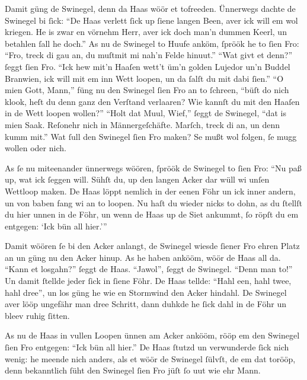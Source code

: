 Damit güng de Swinegel, denn da Haas wöör et tofreeden. Ünnerwegs
dachte de Swinegel bi ſick:
\enquote{De Haas verlett ſick up ſiene langen Been, aver ick will em
wol kriegen. He is zwar en vörnehm Herr, aver ick doch man'n dummen
Keerl, un betahlen ſall he doch.}
As nu de Swinegel to Huufe anköm, ſpröök he to ſien Fro:
\enquote{Fro, treck di gau an, du muſtmit mi nah'n
Felde hinuut.}
\enquote{Wat givt et denn?} ſeggt ſien Fro.
\enquote{Ick hew mit'n Haaſen wett't üm'n golden Lujedor un'n Buddel
Branwien, ick will mit em inn Wett loopen, un da ſalſt du mit dabi
ſien.}
\enquote{O mien Gott, Mann,} füng nu den Swinegel ſien Fro an to
ſchreen, \enquote{büſt do nich klook, heſt du denn ganz den Verſtand
verlaaren? Wie kannſt du mit den Haaſen in de Wett loopen wollen?}
\enquote{Holt dat Muul, Wief,} ſeggt de Swinegel, \enquote{dat is
mien Saak. Reſonehr nich in Männergeſchäfte. Marſch, treck di an, un
denn kumm mit.}
Wat ſull den Swinegel ſien Fro maken? Se mußt wol folgen, ſe mugg
wollen oder nich.

As ſe nu miteenander ünnerwegs wöören, ſpröök de Swinegel to ſien
Fro:
\enquote{Nu paß up, wat ick ſeggen will. Sühſt du, up den langen
Acker dar wüll wi unſen Wettloop maken. De Haas löppt nemlich in der
eenen Föhr un ick inner andern, un von baben
fang wi an to loopen. Nu haſt du wieder nicks to
dohn, as du ſtellſt du hier unnen in de Föhr, un wenn de Haas up de
Siet ankummt, ſo röpſt du em entgegen: \enquote{Ick bün all
hier.}}

Damit wöören ſe bi den Acker anlangt, de Swinegel wiesde ſiener Fro
ehren Platz an un güng nu den Acker hinup. As he haben ankööm, wöör
de Haas all da.
\enquote{Kann et losgahn?} ſeggt de Haas.
\enquote{Jawol}, ſeggt de Swinegel.
\enquote{Denn man to!}
Un damit ſtellde jeder ſick in ſiene Föhr. De Haas tellde:
\enquote{Hahl een, hahl twee, hahl dree}, un los güng he wie en
Stormwind den Acker hindahl. De Swinegel aver lööp
ungefähr man dree Schritt, dann duhkde he ſick dahl
in de Föhr un bleev ruhig ſitten.

As nu de Haas in vullen Loopen ünnen am Acker ankööm, rööp em den
Swinegel ſien Fro entgegen:
\enquote{Ick bün all hier.}
De Haas ſtutzd un verwunderde ſick nich wenig: he meende nich anders,
als et wöör de Swinegel ſülvſt, de em dat torööp, denn bekanntlich
ſüht den Swinegel ſien Fro jüſt ſo uut wie ehr Mann.

